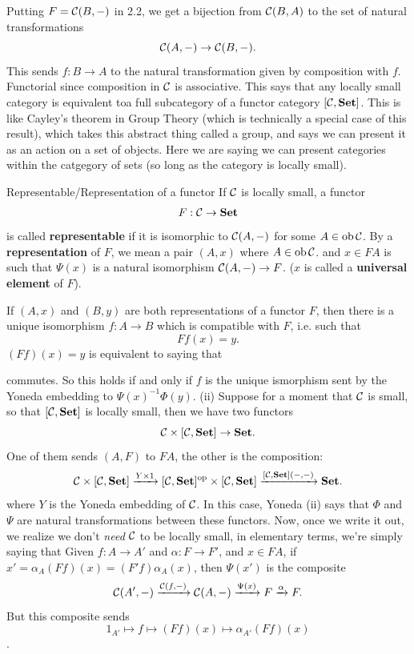 \documentclass{article}
\begin{document}
\proof Putting $F=\mathcal{C}(B, - )$ in 2.2, we get a bijection from $\mathcal{C}(B,A)$ to the set of natural transformations \[ \mathcal{C}(A, - ) \to \mathcal{C}(B, -).\] This sends $f: B \to A$ to the natural transformation given by composition with $f$. Functorial since composition in $\mathcal{C}$ is associative. \endproof 
This says that any locally small category is equivalent toa full subcategory of a functor category $[\mathcal{C}, \textbf{Set}]$. This is like Cayley's theorem in Group Theory (which is technically a special case of this result), which takes this abstract thing called a group, and says we can present it as an action on a set of objects. Here we are saying we can present categories within the catgegory of sets (so long as the category is locally small).
\begin{fancydefine}{Representable/Representation of a functor}
    If $\mathcal{C}$ is locally small, a functor \[ F: \mathcal{C} \to \textbf{Set}\] is called \textbf{representable} if it is isomorphic to $\mathcal{C}(A, -)$ for some $A \in \operatorname{ob} \mathcal{C}$. \gap By a \textbf{representation} of $F$, we mean a pair $(A,x)$ where $A \in \operatorname{ob} \mathcal{C}$. and $x \in FA$ is such that $\Psi(x)$ is a natural isomorphism $\mathcal{C}(A,-) \to F$. ($x$ is called a \textbf{universal element} of $F$).
\end{fancydefine}
\corollary If $(A,x)$ and $(B,y)$ are both representations of a functor $F$, then there is a unique isomorphism $f : A \to B$ which is compatible with $F$, i.e. such that \[ Ff(x)=y.\]
\proof $(Ff)(x)=y$ is equivalent to saying that 
\begin{center}

\end{center}
commutes. So this holds if and only if $f$ is the unique ismorphism sent by the Yoneda embedding to $\Psi(x)^{-1}\Phi(y)$. \endproof
{}(ii) Suppose for a moment that $\mathcal{C}$ is small, so that $[\mathcal{C}, \textbf{Set}]$ is locally small, then we have two functors \[ \mathcal{C} \times [\mathcal{C}, \textbf{Set}] \to \textbf{Set}.\] One of them sends $(A,F)$ to $FA$, the other is the composition: \[ \mathcal{C} \times [\mathcal{C}, \textbf{Set}] \xrightarrow{Y \times 1} [\mathcal{C}, \textbf{Set}]^{\text{op}} \times [\mathcal{C}, \textbf{Set}] \xrightarrow{[\mathcal{C},\textbf{Set}](-,-)} \textbf{Set}.\] where $Y$ is the Yoneda embedding of $\mathcal{C}$.
In this case, Yoneda (ii) says that $\Phi$ and $\Psi$ are natural transformations between these functors. \gap Now, once we write it out, we realize we don't \textit{need} $\mathcal{C}$ to be locally small, in elementary terms, we're simply saying that Given $f: A \to A'$ and $\alpha: F \to F'$, and $x \in FA$, if $x'=\alpha_{A}(Ff)(x)=(F'f)\alpha_{A}(x)$, then $\Psi(x')$ is the composite \[ \mathcal{C}(A', -) \xrightarrow{\mathcal{C}(f,-)} \mathcal{C}(A,-) \xrightarrow{\Psi(x)} F \xrightarrow{\alpha} F. \] But this composite sends \[1_{A'} \mapsto f \mapsto (Ff)(x) \mapsto \alpha_{A'}(Ff)(x)\].
\end{document}
